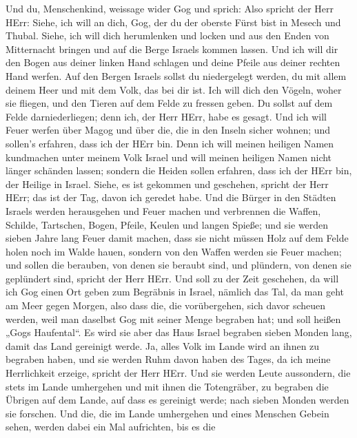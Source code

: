  Und du, Menschenkind, weissage wider Gog und sprich: Also
spricht der Herr HErr: Siehe, ich will an dich, Gog, der du der oberste
Fürst bist in Mesech und Thubal.  Siehe, ich will dich
herumlenken und locken und aus den Enden von Mitternacht bringen und auf
die Berge Israels kommen lassen.  Und ich will dir den Bogen
aus deiner linken Hand schlagen und deine Pfeile aus deiner rechten Hand
werfen.  Auf den Bergen Israels sollst du niedergelegt
werden, du mit allem deinem Heer und mit dem Volk, das bei dir ist. Ich
will dich den Vögeln, woher sie fliegen, und den Tieren auf dem Felde zu
fressen geben.  Du sollst auf dem Felde darniederliegen;
denn ich, der Herr HErr, habe es gesagt.  Und ich will Feuer
werfen über Magog und über die, die in den Inseln sicher wohnen; und
sollen's erfahren, dass ich der HErr bin.  Denn ich will
meinen heiligen Namen kundmachen unter meinem Volk Israel und will
meinen heiligen Namen nicht länger schänden lassen; sondern die Heiden
sollen erfahren, dass ich der HErr bin, der Heilige in Israel.
 Siehe, es ist gekommen und geschehen, spricht der Herr
HErr; das ist der Tag, davon ich geredet habe.  Und die
Bürger in den Städten Israels werden herausgehen und Feuer machen und
verbrennen die Waffen, Schilde, Tartschen, Bogen, Pfeile, Keulen und
langen Spieße; und sie werden sieben Jahre lang Feuer damit machen,
 dass sie nicht müssen Holz auf dem Felde holen noch im
Walde hauen, sondern von den Waffen werden sie Feuer machen; und sollen
die berauben, von denen sie beraubt sind, und plündern, von denen sie
geplündert sind, spricht der Herr HErr.  Und soll zu der
Zeit geschehen, da will ich Gog einen Ort geben zum Begräbnis in Israel,
nämlich das Tal, da man geht am Meer gegen Morgen, also dass die, die
vorübergehen, sich davor scheuen werden, weil man daselbst Gog mit
seiner Menge begraben hat; und soll heißen „Gogs Haufental``.
 Es wird sie aber das Haus Israel begraben sieben Monden
lang, damit das Land gereinigt werde.  Ja, alles Volk im
Lande wird an ihnen zu begraben haben, und sie werden Ruhm davon haben
des Tages, da ich meine Herrlichkeit erzeige, spricht der Herr HErr.
 Und sie werden Leute aussondern, die stets im Lande
umhergehen und mit ihnen die Totengräber, zu begraben die Übrigen auf
dem Lande, auf dass es gereinigt werde; nach sieben Monden werden sie
forschen.  Und die, die im Lande umhergehen und eines
Menschen Gebein sehen, werden dabei ein Mal aufrichten, bis es die
